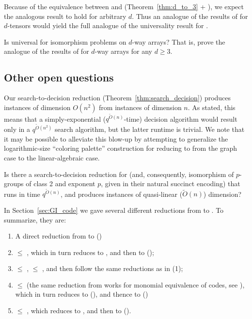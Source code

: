 \documentclass[11pt]{article}
\begin{document}
Because of the equivalence between \DeeTIlong and \ThreeTIlong (Theorem~\ref{thm:d_to_3} + \cite{FGS19}), we expect the analogous result to hold for arbitrary $d$. Thus an analogue of the results of \cite{FGS19} for $d$-tensors would yield the full analogue of the universality result for \GI.

\begin{question}
Is \DeeTIlong universal for isomorphism problems on $d$-way arrays? That is, prove the analogue of the results of \cite{FGS19} for $d$-way arrays for any $d \geq 3$.
\end{question}

\subsection{Other open questions}
Our search-to-decision reduction (Theorem~\ref{thm:search_decision}) produces instances of dimension $O(n^2)$ from instances of dimension $n$. As stated, this means that a simply-exponential ($q^{\tilde O(n)}$-time) decision algorithm would result only in a $q^{\tilde O(n^2)}$ search algorithm, but the latter runtime is trivial. We note that it may be possible to alleviate this blow-up by attempting to generalize the logarithmic-size ``coloring palette'' construction for reducing  to \GI  from the graph case to the linear-algebraic case.

\begin{question} \label{question:search_decision}
Is there a search-to-decision reduction for \AltMatSpIsomWords (and, consequently, isomorphism of $p$-groups of class 2 and exponent $p$, given in their natural succinct encoding) that runs in time $q^{\tilde O(n)}$, and produces instances of quasi-linear ($\tilde O(n)$) dimension?
\end{question}

In Section~\ref{sec:GI_code} we gave several different reductions from \GI to \AltMatSpIsomWords. To summarize, they are: 
\begin{enumerate}
\item A direct reduction from \GI to \AltMatSpIsomlong ()
\item \GI $\leq$ \MatLieConjlong \cite{GrochowLie}, which in turn reduces to \ThreeTI \cite{FGS19}, and then to \AltMatSpIsomlong (); 
\item \GI $\leq$ \CodeEq \cite{PR97, Luks, miyazakiCodeEq}, \CodeEq $\leq$ \MatLieConjlong \cite{GrochowLie}, and then follow the same reductions as in (1);
\item \GI $\leq$ \MonCodeEqlong (the same reduction from \cite{PR97} works for monomial equivalence of codes, see \cite{GrochowLie}), which in turn reduces to \ThreeTI (), and thence to \AltMatSpIsomlong ()
\item \GI $\leq$  \cite{Grigoriev83, AS05}, which reduces to \ThreeTI \cite{FGS19}, and then to \AltMatSpIsomWords ().
\end{enumerate}
\end{document}
